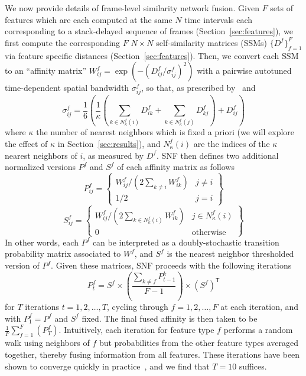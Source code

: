 \documentclass{article}
\begin{document}
We now provide details of frame-level similarity network fusion.  Given $F$ sets of features which are each computed at the same $N$ time intervals each corresponding to a stack-delayed sequence of frames (Section~\ref{sec:features}), we first compute the corresponding $F$ $N \times N$ self-similarity matrices (SSMs) $\{D^{f}\}_{f=1}^F$ via feature specific distances (Section~\ref{sec:features}).  Then, we convert each SSM to an ``affinity matrix'' $W^{f}_{ij} = \exp \left( -(D^{f}_{ij} / \sigma^{f}_{ij})^2 \right)$ with a pairwise autotuned time-dependent spatial bandwidth $\sigma^{f}_{ij}$, so that, as prescribed by~\cite{wang2012unsupervised} and~\cite{wang2014similarity}
\begin{equation}
    \sigma^{f}_{ij} = \frac{1}{6} \left( \frac{1}{\kappa} \left( \sum_{k \in N^{f}_\kappa(i)} D^{f}_{ik} +   \sum_{k \in N^{f}_\kappa(j)} D^{f}_{kj} \right) + D^{f}_{ij} \right)
\end{equation}
where $\kappa$ the number of nearest neighbors which is fixed a priori (we will explore the effect of $\kappa$ in Section~\ref{sec:results}), and $N^{f}_\kappa(i)$ are the indices of the $\kappa$ nearest neighbors of $i$, as measured by $D^{f}$.  SNF then defines two additional normalized versions $P^{f}$ and $S^{f}$ of each affinity matrix as follows
\begin{equation}
    P^{f}_{ij} = \left\{ \begin{array}{cc} W^{f}_{ij} / (2 \sum_{k \neq i} W^{f}_{ik}) & j \neq i \\ 1/2 & j = i \end{array} \right\}
\end{equation}
\begin{equation}
    S^{f}_{ij} = \left\{ \begin{array}{cc} W^{f}_{ij} / (2 \sum_{k \in N^{f}_\kappa(i)} W^{f}_{ik}) & j \in N^{f}_\kappa(i) \\ 0 &  \text{otherwise} \end{array} \right\}
\end{equation}
In other words, each $P^{f}$ can be interpreted as a doubly-stochastic transition probability matrix associated to $W^{f}$, and $S^{f}$ is the nearest neighbor thresholded version of $P^{f}$.  Given these matrices, SNF proceeds with the following iterations
\begin{equation}
    P^{f}_t = S^{f} \times \left( \frac{\sum_{k \neq f} P^{k}_{t-1}}{F-1}  \right) \times (S^{f})^{\mathsf{T}}
\end{equation}
for $T$ iterations $t = 1, 2, \dots, T$, cycling through $f = 1, 2, \dots, F$ at each iteration, and with $P^{f}_1 = P^{f}$ and $S^{f}$ fixed.  The final fused affinity is then taken to be $\frac{1}{F} \sum_{f = 1}^{F} (P^{f}_T)$. Intuitively, each iteration for feature type $f$ performs a random walk using neighbors of $f$ but probabilities from the other feature types averaged together, thereby fusing information from all features.  These iterations have been shown to converge quickly in practice~\cite{wang2012unsupervised,wang2014similarity}, and we find that $T = 10$ suffices.
\end{document}
